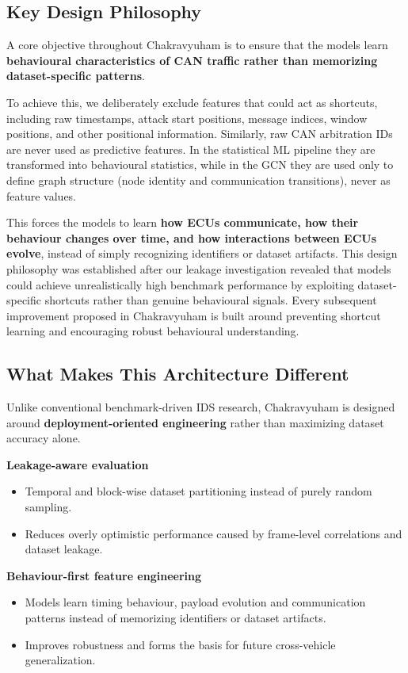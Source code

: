 \documentclass{article}
\begin{document}
\subsection{Key Design Philosophy}
A core objective throughout Chakravyuham is to ensure that the models learn \textbf{behavioural characteristics of CAN traffic rather than memorizing dataset-specific patterns}.

To achieve this, we deliberately exclude features that could act as shortcuts, including raw timestamps, attack start positions, message indices, window positions, and other positional information. Similarly, raw CAN arbitration IDs are never used as predictive features. In the statistical ML pipeline they are transformed into behavioural statistics, while in the GCN they are used only to define graph structure (node identity and communication transitions), never as feature values.

This forces the models to learn \textbf{how ECUs communicate, how their behaviour changes over time, and how interactions between ECUs evolve}, instead of simply recognizing identifiers or dataset artifacts. This design philosophy was established after our leakage investigation revealed that models could achieve unrealistically high benchmark performance by exploiting dataset-specific shortcuts rather than genuine behavioural signals. Every subsequent improvement proposed in Chakravyuham is built around preventing shortcut learning and encouraging robust behavioural understanding.

\subsection{What Makes This Architecture Different}
Unlike conventional benchmark-driven IDS research, Chakravyuham is designed around \textbf{deployment-oriented engineering} rather than maximizing dataset accuracy alone.

\textbf{Leakage-aware evaluation}
\begin{itemize}[noitemsep]
    \item Temporal and block-wise dataset partitioning instead of purely random sampling.
    \item Reduces overly optimistic performance caused by frame-level correlations and dataset leakage.
\end{itemize}

\textbf{Behaviour-first feature engineering}
\begin{itemize}[noitemsep]
    \item Models learn timing behaviour, payload evolution and communication patterns instead of memorizing identifiers or dataset artifacts.
    \item Improves robustness and forms the basis for future cross-vehicle generalization.
\end{itemize}
\end{document}
